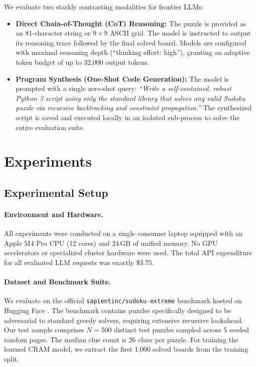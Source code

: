 \documentclass{article} %
\begin{document}
We evaluate two starkly contrasting modalities for frontier LLMs:
\begin{itemize}
    \item \textbf{Direct Chain-of-Thought (CoT) Reasoning:} The puzzle is provided as an 81-character string or $9 \times 9$ ASCII grid. The model is instructed to output its reasoning trace followed by the final solved board. Models are configured with maximal reasoning depth (``thinking effort: high''), granting an adaptive token budget of up to 32,000 output tokens.
    \item \textbf{Program Synthesis (One-Shot Code Generation):} The model is prompted with a single zero-shot query: \textit{``Write a self-contained, robust Python 3 script using only the standard library that solves any valid Sudoku puzzle via recursive backtracking and constraint propagation.''} The synthesized script is saved and executed locally in an isolated sub-process to solve the entire evaluation suite.
\end{itemize}

\section{Experiments}
\label{sec:experiments}

\subsection{Experimental Setup}
\paragraph{Environment and Hardware.} All experiments were conducted on a single consumer laptop equipped with an Apple M4 Pro CPU (12 cores) and $24\,\mathrm{GB}$ of unified memory. No GPU accelerators or specialized cluster hardware were used. The total API expenditure for all evaluated LLM requests was exactly $\$3.75$.

\paragraph{Dataset and Benchmark Suite.}
We evaluate on the official \texttt{sapientinc/sudoku-extreme} benchmark hosted on Hugging Face \citep{sapientinc2024sudoku}. The benchmark contains puzzles specifically designed to be adversarial to standard greedy solvers, requiring extensive recursive lookahead. Our test sample comprises $N = 500$ distinct test puzzles sampled across 5 seeded random pages. The median clue count is 26 clues per puzzle. For training the learned CRAM model, we extract the first 1,000 solved boards from the training split.
\end{document}
